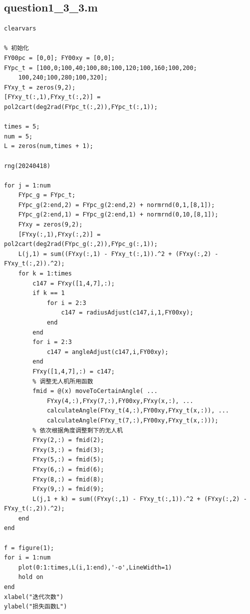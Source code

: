 \documentclass[12pt,AutoFakeSlant,AutoFakeBold]{article}
\begin{document}
\subsection{question1\_3\_3.m}
\begin{verbatim}
clearvars

% 初始化
FY00pc = [0,0]; FY00xy = [0,0];
FYpc_t = [100,0;100,40;100,80;100,120;100,160;100,200;
    100,240;100,280;100,320];
FYxy_t = zeros(9,2);
[FYxy_t(:,1),FYxy_t(:,2)] = pol2cart(deg2rad(FYpc_t(:,2)),FYpc_t(:,1));

times = 5;
num = 5;
L = zeros(num,times + 1);

rng(20240418)

for j = 1:num
    FYpc_g = FYpc_t;
    FYpc_g(2:end,2) = FYpc_g(2:end,2) + normrnd(0,1,[8,1]);
    FYpc_g(2:end,1) = FYpc_g(2:end,1) + normrnd(0,10,[8,1]);
    FYxy = zeros(9,2);
    [FYxy(:,1),FYxy(:,2)] = pol2cart(deg2rad(FYpc_g(:,2)),FYpc_g(:,1));
    L(j,1) = sum((FYxy(:,1) - FYxy_t(:,1)).^2 + (FYxy(:,2) - FYxy_t(:,2)).^2);
    for k = 1:times
        c147 = FYxy([1,4,7],:);
        if k == 1
            for i = 2:3
                c147 = radiusAdjust(c147,i,1,FY00xy);
            end
        end
        for i = 2:3
            c147 = angleAdjust(c147,i,FY00xy);
        end
        FYxy([1,4,7],:) = c147;
        % 调整无人机所用函数
        fmid = @(x) moveToCertainAngle( ...
            FYxy(4,:),FYxy(7,:),FY00xy,FYxy(x,:), ...
            calculateAngle(FYxy_t(4,:),FY00xy,FYxy_t(x,:)), ...
            calculateAngle(FYxy_t(7,:),FY00xy,FYxy_t(x,:)));
        % 依次根据角度调整剩下的无人机
        FYxy(2,:) = fmid(2);
        FYxy(3,:) = fmid(3);
        FYxy(5,:) = fmid(5);
        FYxy(6,:) = fmid(6);
        FYxy(8,:) = fmid(8);
        FYxy(9,:) = fmid(9);
        L(j,1 + k) = sum((FYxy(:,1) - FYxy_t(:,1)).^2 + (FYxy(:,2) - FYxy_t(:,2)).^2);
    end
end

f = figure(1);
for i = 1:num
    plot(0:1:times,L(i,1:end),'-o',LineWidth=1)
    hold on
end
xlabel("迭代次数")
ylabel("损失函数L")
\end{verbatim}
\end{document}
